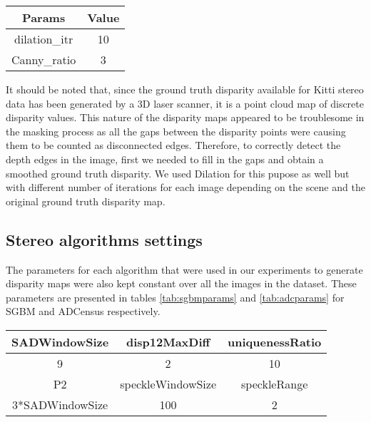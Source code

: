 \begin{minipage}{\linewidth}
\begin{center}
\label{tab:candilparam}
\begin{tabular}{ |c|c| }
\hline
\textbf{Params} & \textbf{Value} \\ \hline
dilation\_itr & 10 \\  \hline
Canny\_ratio & 3 \\ \hline
\end{tabular}
\end{center}
\end{minipage} \newline

It should be noted that, since the ground truth disparity available for Kitti stereo data has been generated by a 3D laser scanner,
it is a point cloud map of discrete disparity values. This nature of the disparity maps appeared to be troublesome in the masking process as all the gaps
between the disparity points were causing them to be counted as disconnected edges. Therefore, to correctly detect the 
depth edges in the image, first we needed to fill in the gaps and obtain a smoothed ground truth disparity. We used Dilation for this pupose as well but with different number
of iterations for each image depending on the scene and the original ground truth disparity map.


\subsection{Stereo algorithms settings}
The parameters for each algorithm that were used in our experiments to generate disparity
maps were also kept constant over all the images in the dataset. These parameters are presented in tables \ref{tab:sgbmparams} and \ref{tab:adcparams} 
for SGBM and ADCensus respectively. \newline

\begin{minipage}{0.8\linewidth}
\begin{center}
\label{tab:sgbmparams}
\begin{tabular}{ |c|c|c| }
\hline
SADWindowSize & disp12MaxDiff & uniquenessRatio\\  \hline
9 & 2 & 10 \\ \hline
P2 & speckleWindowSize & speckleRange \\ \hline
3*SADWindowSize & 100 & 2  \\ \hline
\end{tabular}
\end{center}
\end{minipage} \newline \newline

